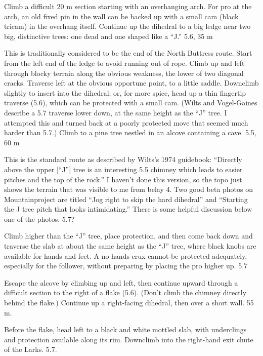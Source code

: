 \documentclass{tahquitz}
\begin{document}
 Climb a difficult 20 m section starting with an overhanging
arch.  For pro at the arch, an old fixed pin in the wall can be
backed up with a small cam (black tricam) in the overhang itself.
Continue up the dihedral to a big ledge near two big, distinctive
trees: one dead and one shaped like a ``J.'' 5.6, 35 m


 This is traditionally considered to be the end of the
North Buttress route. Start from the left end of the ledge to avoid
running out of rope. Climb up and left through blocky terrain along the obvious weakness, the
lower of two diagonal cracks. Traverse left at the obvious opportune point, to a
little saddle. Downclimb slightly to insert into the dihedral; or, for more spice,
head up a thin fingertip traverse (5.6),
which can be protected with a small cam. (Wilts and Vogel-Gaines describe a 5.7 traverse lower
down, at the same height as the ``J'' tree. I attempted this and turned back at a poorly
protected move that seemed much harder than 5.7.)
Climb to a pine tree nestled in an alcove containing a cave. 5.5, 60 m

 This is the standard route as described by Wilts's 1974 guidebook:
``Directly above the upper [``J''] tree is an interesting 5.5 chimney which leads
to easier pitches and the top of the rock.''
I haven't done this version, so the topo just shows the terrain that was visible
to me from belay 4. Two good beta
photos on Mountainproject are titled ``Jog right to skip the hard dihedral''
and ``Starting the J tree pitch that looks intimidating.''
There is some helpful discussion below one of the photos. 5.7?

 Climb higher than the ``J'' tree, place protection, and then come
back down and traverse the slab at about the same height as the ``J'' tree, where black
knobs are available for hands and feet. A no-hands crux cannot be protected adequately,
especially for the follower, without preparing by placing the pro higher up. 5.7

 Escape the alcove by climbing up and left, then continue
upward through a difficult section to the right of a flake (5.6).
(Don't climb the chimney directly behind the flake.) Continue up a
right-facing dihedral, then over a short wall.
55 m. 

 Before the flake, head left to a black and white mottled slab, with underclings
and protection available along its rim. Downclimb into the right-hand exit chute of the Larks. 5.7.
\end{document}
